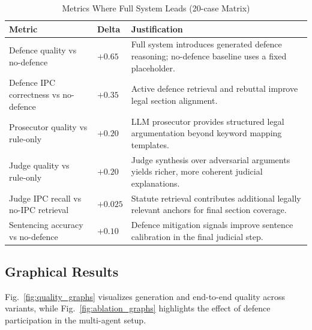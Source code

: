 \documentclass[conference]{IEEEtran}
\begin{document}
\begin{table}[!t]
\caption{Metrics Where Full System Leads (20-case Matrix)}
\label{tab:fullsystem_leads}
\centering
\begin{tabular}{|p{}|p{}|p{}|}
\hline
\textbf{Metric} & \textbf{Delta} & \textbf{Justification} \\
\hline
Defence quality vs no-defence & $+0.65$ & Full system introduces generated defence reasoning; no-defence baseline uses a fixed placeholder. \\
Defence IPC correctness vs no-defence & $+0.35$ & Active defence retrieval and rebuttal improve legal section alignment. \\
Prosecutor quality vs rule-only & $+0.20$ & LLM prosecutor provides structured legal argumentation beyond keyword mapping templates. \\
Judge quality vs rule-only & $+0.20$ & Judge synthesis over adversarial arguments yields richer, more coherent judicial explanations. \\
Judge IPC recall vs no-IPC retrieval & $+0.025$ & Statute retrieval contributes additional legally relevant anchors for final section coverage. \\
Sentencing accuracy vs no-defence & $+0.10$ & Defence mitigation signals improve sentence calibration in the final judicial step. \\
\hline
\end{tabular}
\end{table}

\subsection{Graphical Results}
Fig.~\ref{fig:quality_graphs} visualizes generation and end-to-end quality across variants, while Fig.~\ref{fig:ablation_graphs} highlights the effect of defence participation in the multi-agent setup.
\end{document}
